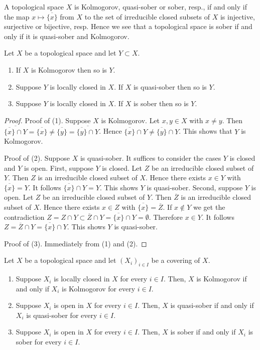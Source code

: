 \noindent
A topological space $X$ is Kolmogorov, quasi-sober or sober, resp., if and
only if the map $x\mapsto\overline{\{x\}}$ from $X$ to the set of
irreducible closed subsets of $X$ is injective, surjective or bijective,
resp. Hence we see that a topological space is sober if and only if it is
quasi-sober and Kolmogorov.

\begin{lemma}
\label{lemma-sober-subspace}
Let $X$ be a topological space and let $Y\subset X$.
\begin{enumerate}
\item If $X$ is Kolmogorov then so is $Y$.
\item Suppose $Y$ is locally closed in $X$. If $X$ is quasi-sober then
so is $Y$.
\item Suppose $Y$ is locally closed in $X$. If $X$ is sober then so is $Y$.
\end{enumerate}
\end{lemma}

\begin{proof}
Proof of (1). Suppose $X$ is Kolmogorov. Let $x,y\in X$ with $x\neq y$. Then
$\overline{\overline{\{x\}}\cap Y}=\overline{\{x\}}\neq\overline{\{y\}}=
\overline{\overline{\{y\}}\cap Y}$. Hence
$\overline{\{x\}}\cap Y\neq\overline{\{y\}}\cap Y$. This shows that $Y$ is
Kolmogorov.

\medskip\noindent
Proof of (2). Suppose $X$ is quasi-sober. It suffices to consider the
cases $Y$ is closed and $Y$ is open. First, suppose $Y$ is closed. Let
$Z$ be an irreducible closed subset of $Y$. Then $Z$ is an irreducible closed
subset of $X$. Hence there exists $x\in Y$ with $\overline{\{x\}}=Y$. It
follows $\overline{\{x\}}\cap Y=Y$. This shows $Y$ is quasi-sober. Second,
suppose $Y$ is open. Let $Z$ be an irreducible closed subset of $Y$. Then
$\overline{Z}$ is an irreducible closed subset of $X$. Hence there
exists $x\in Z$ with $\overline{\{x\}}=\overline{Z}$. If
$x\notin Y$ we get the contradiction
$Z=Z\cap Y\subset\overline{Z}\cap Y=\overline{\{x\}}\cap Y=\emptyset$.
Therefore $x\in Y$. It follows $Z=\overline{Z}\cap Y=\overline{\{x\}}\cap Y$.
This shows $Y$ is quasi-sober.

\medskip\noindent
Proof of (3). Immediately from (1) and (2).
\end{proof}

\begin{lemma}
\label{lemma-sober-local}
Let $X$ be a topological space and let $(X_i)_{i\in I}$ be a covering of $X$.
\begin{enumerate}
\item Suppose $X_i$ is locally closed in $X$ for every $i\in I$. Then, $X$ is
Kolmogorov if and only if $X_i$ is Kolmogorov for every $i\in I$.
\item Suppose $X_i$ is open in $X$ for every $i\in I$. Then, $X$ is
quasi-sober if and only if $X_i$ is quasi-sober for every $i\in I$.
\item Suppose $X_i$ is open in $X$ for every $i\in I$. Then, $X$ is sober if
and  only if $X_i$ is sober for every $i\in I$.
\end{enumerate}
\end{lemma}

